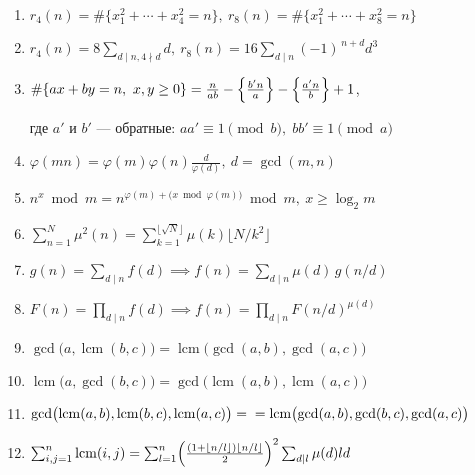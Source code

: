 \begin{enumerate}
\item %
$r_4(n)=\#\{x_1^2+\cdots+x_4^2=n\},\ 
r_8(n)=\#\{x_1^2+\cdots+x_8^2=n\}$

\item %
$r_4(n)=8\sum_{d\mid n, 4\nmid d}d,\ 
r_8(n)=16\sum_{d\mid n}(-1)^{\,n+d}d^3$

\item %
$\#\{ax+by=n,\ x,y\ge0\}=\frac{n}{ab}-\Bigl\{\tfrac{b'n}{a}\Bigr\}-\Bigl\{\tfrac{a'n}{b}\Bigr\}+1$,

где $a'$ и $b'$ — обратные: $aa'\equiv1\pmod b,\; bb'\equiv1\pmod a$

\item %
$\varphi(mn)=\varphi(m)\varphi(n)\frac{d}{\varphi(d)},\  d=\gcd(m,n)$

\item %
$n^x\bmod m = n^{\varphi(m)+\bigl(x\bmod\varphi(m)\bigr)}\bmod m,\ x\ge\log_2 m$

\item %
$\sum_{n=1}^N\mu^2(n)=\sum_{k=1}^{\lfloor\sqrt N\rfloor}\mu(k)\bigl\lfloor N/k^2\bigr\rfloor$

\item %
$g(n)=\sum_{d\mid n}f(d) \implies f(n)=\sum_{d\mid n}\mu(d)\,g(n/d)$

\item %
$F(n)=\prod_{d\mid n}f(d) \implies f(n)=\prod_{d\mid n}F(n/d)^{\mu(d)}$

\item %
$\gcd\bigl(a,\operatorname{lcm}(b,c)\bigr)=\operatorname{lcm}\bigl(\gcd(a,b),\gcd(a,c)\bigr)$

\item %
$\operatorname{lcm}\bigl(a,\gcd(b,c)\bigr)=\gcd\bigl(\operatorname{lcm}(a,b),\operatorname{lcm}(a,c)\bigr)$

\item %
$\gcd\bigl(\operatorname{lcm}(a,b),\operatorname{lcm}(b,c),\operatorname{lcm}(a,c)\bigr)
 =\\= \operatorname{lcm}\bigl(\gcd(a,b),\gcd(b,c),\gcd(a,c)\bigr)$

\item %
$\sum_{i,j=1}^n\operatorname{lcm}(i,j)
=\sum_{l=1}^n\Bigl(\frac{(1+\lfloor n/l\rfloor)\lfloor n/l\rfloor}{2}\Bigr)^2\sum_{d\mid l}\mu(d)ld$


\end{enumerate}
